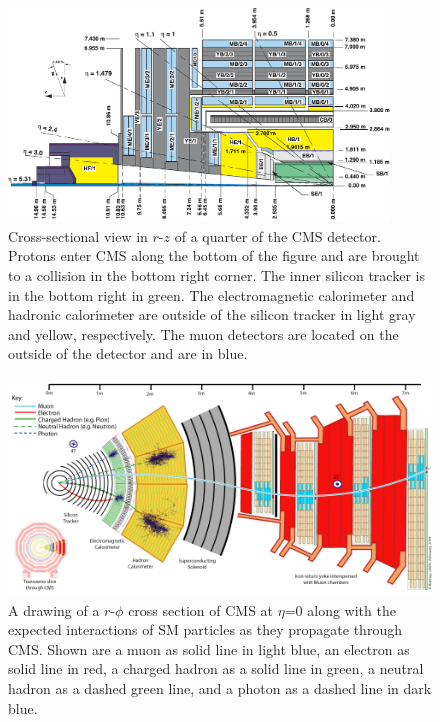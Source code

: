 \begin{figure}
  \begin{center}
      \includegraphics[clip=true, trim=0.0cm 0cm 3.0cm 0cm, width=0.9\textwidth]{figures/apparatus/CMS_LongView_noME42.pdf}
        \caption[Cross-section view of CMS detector]
        {Cross-sectional view in $r$-$z$ of a quarter of the CMS detector. Protons enter CMS along the bottom of the figure and are brought to a collision in the bottom right corner.
The inner silicon tracker is in the bottom right in green. The electromagnetic calorimeter and hadronic calorimeter are outside of the silicon tracker
in light gray and yellow, respectively.
The muon detectors are located on the outside of the detector and are in blue.
         }
      \label{fig:CMSPart}
  \end{center}
\end{figure}

\begin{figure}
  \begin{center}
      \includegraphics[clip=true, trim=0.0cm 0cm 3.0cm 0cm, width=\textwidth]{figures/apparatus/CMS_Slice.png}
        \caption[A drawing of a cross section of CMS along with the expected interactions of SM particles as they propagate through CMS.]
	    {A drawing of a $r$-$\phi$ cross section of CMS at $\eta$=0 along with the expected interactions of SM particles as they propagate through CMS.
Shown are a muon as solid line in light blue, an electron as solid line in red, a charged hadron as a solid line in green, a neutral hadron as a dashed green line,
and a photon as a dashed line in dark blue.
        }
      \label{fig:CMSSlice}
  \end{center}
\end{figure}

